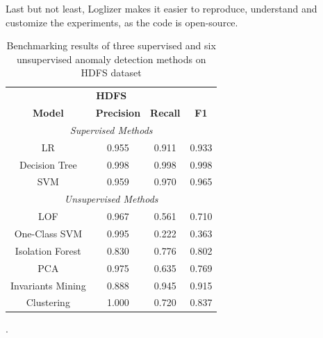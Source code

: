 Last but not least, Loglizer makes it easier to reproduce, understand and customize the experiments, as the code is open-source.

\begin{table}[h]
\centering
\begin{tabular}{@{}cccc@{}}
\toprule
\multicolumn{4}{c}{\textbf{HDFS}} \\ 
\textbf{Model}    & \textbf{Precision} & \textbf{Recall} & \textbf{F1} \\  \toprule \midrule
\multicolumn{4}{c}{\textit{Supervised Methods}}                        \\ \midrule
LR                & 0.955              & 0.911           & 0.933       \\
Decision Tree     & 0.998              & 0.998           & 0.998       \\
SVM               & 0.959              & 0.970           & 0.965       \\ \midrule
\multicolumn{4}{c}{\textit{Unsupervised Methods}}                      \\ \midrule
LOF      & 0.967              & 0.561           & 0.710       \\
One-Class SVM     & 0.995              & 0.222           & 0.363       \\
Isolation Forest  & 0.830              & 0.776           & 0.802       \\
PCA               & 0.975              & 0.635           & 0.769       \\
Invariants Mining & 0.888              & 0.945           & 0.915       \\
Clustering        & 1.000              & 0.720           & 0.837       \\ \bottomrule
\end{tabular}
\caption{Benchmarking results of three supervised and six unsupervised anomaly detection methods on HDFS dataset \cite{he2016}}.
\label{table:loglizer}
\end{table}

